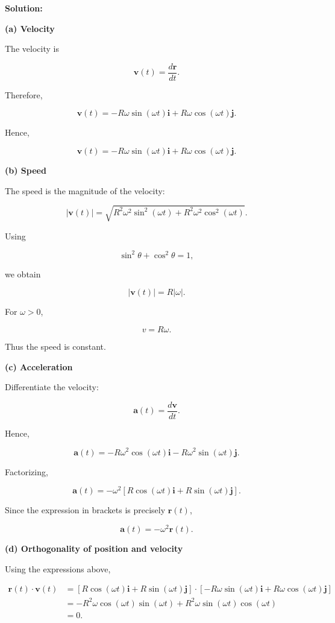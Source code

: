 \documentclass[../main.tex]{subfiles}
\theoremstyle{remark}
\begin{document}
\textbf{Solution:}

\textbf{(a) Velocity}

The velocity is

\[
\mathbf{v}(t)
=
\frac{d\mathbf{r}}{dt}.
\]

Therefore,

\[
\mathbf{v}(t)
=
-R\omega\sin(\omega t)\mathbf{i}
+
R\omega\cos(\omega t)\mathbf{j}.
\]

Hence,

\[
\boxed{
\mathbf{v}(t)
=
-R\omega\sin(\omega t)\mathbf{i}
+
R\omega\cos(\omega t)\mathbf{j}.
}
\]

\textbf{(b) Speed}

The speed is the magnitude of the velocity:

\[
|\mathbf{v}(t)|
=
\sqrt{
R^2\omega^2\sin^2(\omega t)
+
R^2\omega^2\cos^2(\omega t)
}.
\]

Using

\[
\sin^2\theta+\cos^2\theta=1,
\]

we obtain

\[
|\mathbf{v}(t)|
=
R|\omega|.
\]

For \(\omega>0\),

\[
\boxed{
v=R\omega.
}
\]

Thus the speed is constant.

\textbf{(c) Acceleration}

Differentiate the velocity:

\[
\mathbf{a}(t)
=
\frac{d\mathbf{v}}{dt}.
\]

Hence,

\[
\mathbf{a}(t)
=
-R\omega^2\cos(\omega t)\mathbf{i}
-
R\omega^2\sin(\omega t)\mathbf{j}.
\]

Factorizing,

\[
\boxed{
\mathbf{a}(t)
=
-\omega^2
\left[
R\cos(\omega t)\mathbf{i}
+
R\sin(\omega t)\mathbf{j}
\right].
}
\]

Since the expression in brackets is precisely \(\mathbf{r}(t)\),

\[
\boxed{
\mathbf{a}(t)=-\omega^2\mathbf{r}(t).
}
\]

\textbf{(d) Orthogonality of position and velocity}

Using the expressions above,

\begin{align}
\mathbf{r}(t)\cdot\mathbf{v}(t)
&=
\left[
R\cos(\omega t)\mathbf{i}
+
R\sin(\omega t)\mathbf{j}
\right]
\cdot
\left[
-R\omega\sin(\omega t)\mathbf{i}
+
R\omega\cos(\omega t)\mathbf{j}
\right]
\\
&=
-R^2\omega\cos(\omega t)\sin(\omega t)
+
R^2\omega\sin(\omega t)\cos(\omega t)
\\
&=0.
\end{align}
\end{document}
